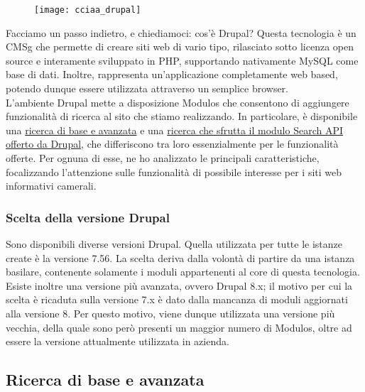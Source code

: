 		\label{img:cciaa_drupal}
		\begin{figure}[htbp]
			\begin{center}
				\texttt{[image: cciaa\_drupal]}
			\end{center}
		\end{figure}
	
		Facciamo un passo indietro, e chiediamoci: cos'è Drupal?
		Questa tecnologia è un \gls{CMSg} che permette di creare siti web di vario tipo, rilasciato sotto licenza \gls{open source} e interamente sviluppato in \gls{PHP}, supportando nativamente \gls{MySQL} come base di dati. Inoltre, rappresenta un'applicazione completamente web based, potendo dunque essere utilizzata attraverso un semplice browser. \\		
		L'ambiente \gls{Drupal} mette a disposizione \glspl{Modulo} che consentono di aggiungere funzionalità di ricerca al sito che stiamo realizzando. In particolare, è disponibile una \hyperref[cap:drupalSearch]{ricerca di base e avanzata} e una \hyperref[cap:drupalSearchAPI]{ricerca che sfrutta il modulo Search API offerto da Drupal}, che differiscono tra loro essenzialmente per le funzionalità offerte. Per ognuna di esse, ne ho analizzato le principali caratteristiche, focalizzando l'attenzione sulle funzionalità di possibile interesse per i siti web informativi camerali.
		
			\subsubsection {Scelta della versione Drupal}
			Sono disponibili diverse versioni \gls{Drupal}. Quella utilizzata per tutte le istanze create è la versione 7.56. La scelta deriva dalla volontà di partire da una istanza basilare, contenente solamente i moduli appartenenti al core di questa tecnologia. Esiste inoltre una versione più avanzata, ovvero Drupal 8.x; il motivo per cui la scelta è ricaduta sulla versione 7.x è dato dalla mancanza di moduli aggiornati alla versione 8. Per questo motivo, viene dunque utilizzata una versione più vecchia, della quale sono però presenti un maggior numero di \glspl{Modulo}, oltre ad essere la versione attualmente utilizzata in azienda.
		
		\subsection{Ricerca di base e avanzata}


